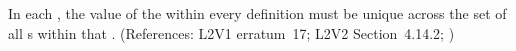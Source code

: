 In each \Event, the value of the   within every
\EventAssignment definition must be unique across the set of all
\EventAssignment{}s within that \Event.  (References: L2V1 erratum~17; 
L2V2 Section~4.14.2; )
